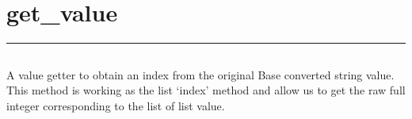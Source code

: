\documentclass[letterpaper,10pt,english]{sphinxmanual}
\begin{document}
\subsection{}
\label{\detokenize{complement_atv3.1:source-code}}
\begin{sphinxVerbatim}[commandchars=\\\{\}]
 
\end{sphinxVerbatim}

\newpage
\section{get\_value}
\label{\detokenize{get_valuev3.1:get-value}}\label{\detokenize{get_valuev3.1::doc}}
\begin{sphinxVerbatim}[commandchars=\\\{\}]
 
\end{sphinxVerbatim}


\bigskip\hrule\bigskip



\subsection{}
\label{\detokenize{get_valuev3.1:algorithm}}
\sphinxAtStartPar
A value getter to obtain an index from the original Base converted string value.
This method is working as the list ‘index’ method and allow us to get the raw full integer corresponding to the list of list value.
\end{document}
